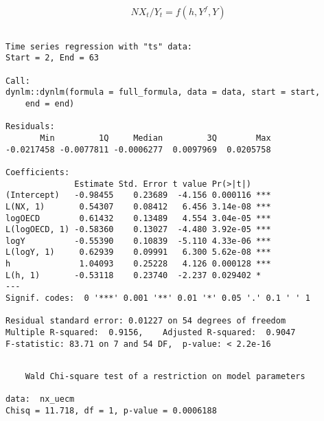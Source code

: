 \documentclass[
  letterpaper,
  DIV=11,
  numbers=noendperiod]{scrartcl}
\begin{document}
\[
NX_t/Y_t = f(h, Y^f, Y)
\]

\begin{verbatim}

Time series regression with "ts" data:
Start = 2, End = 63

Call:
dynlm::dynlm(formula = full_formula, data = data, start = start, 
    end = end)

Residuals:
       Min         1Q     Median         3Q        Max 
-0.0217458 -0.0077811 -0.0006277  0.0097969  0.0205758 

Coefficients:
              Estimate Std. Error t value Pr(>|t|)    
(Intercept)   -0.98455    0.23689  -4.156 0.000116 ***
L(NX, 1)       0.54307    0.08412   6.456 3.14e-08 ***
logOECD        0.61432    0.13489   4.554 3.04e-05 ***
L(logOECD, 1) -0.58360    0.13027  -4.480 3.92e-05 ***
logY          -0.55390    0.10839  -5.110 4.33e-06 ***
L(logY, 1)     0.62939    0.09991   6.300 5.62e-08 ***
h              1.04093    0.25228   4.126 0.000128 ***
L(h, 1)       -0.53118    0.23740  -2.237 0.029402 *  
---
Signif. codes:  0 '***' 0.001 '**' 0.01 '*' 0.05 '.' 0.1 ' ' 1

Residual standard error: 0.01227 on 54 degrees of freedom
Multiple R-squared:  0.9156,    Adjusted R-squared:  0.9047 
F-statistic: 83.71 on 7 and 54 DF,  p-value: < 2.2e-16
\end{verbatim}

\begin{verbatim}

    Wald Chi-square test of a restriction on model parameters

data:  nx_uecm
Chisq = 11.718, df = 1, p-value = 0.0006188
\end{verbatim}
\end{document}
